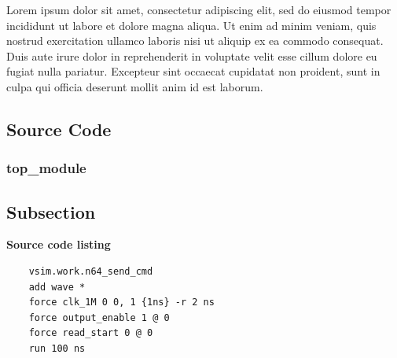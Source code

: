 \documentclass[a4paper,titlepage]{article}
\begin{document}
Lorem ipsum dolor sit amet, consectetur adipiscing elit, sed do eiusmod tempor incididunt ut labore et dolore magna aliqua. Ut enim ad minim veniam, quis nostrud exercitation ullamco laboris nisi ut aliquip ex ea commodo consequat. Duis aute irure dolor in reprehenderit in voluptate velit esse cillum dolore eu fugiat nulla pariatur. Excepteur sint occaecat cupidatat non proident, sunt in culpa qui officia deserunt mollit anim id est laborum.

\subsection{Source Code}

\subsubsection{top\_module}


\subsection{Subsection}

\textbf{Source code listing}
\begin{lstlisting}
    vsim.work.n64_send_cmd
    add wave *
    force clk_1M 0 0, 1 {1ns} -r 2 ns
    force output_enable 1 @ 0
    force read_start 0 @ 0
    run 100 ns
\end{lstlisting}

\pagebreak



\end{document}
